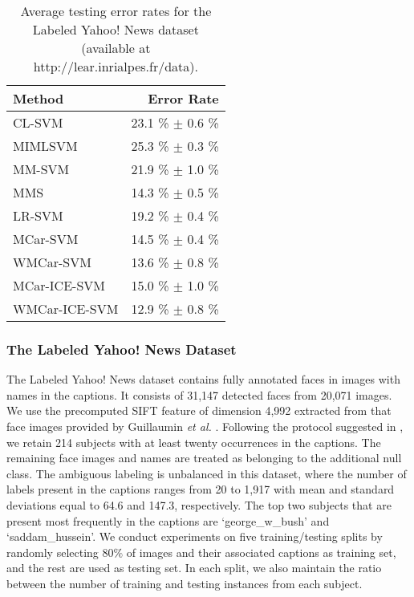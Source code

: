 \documentclass[10pt,journal,compsoc]{IEEEtran}
\newcommand{\head}[1]{\textnormal{\textbf{#1}}}
\begin{document}
\begin{table}
\begin{center}
\begin{tabular}{lr}
  \toprule[1.0pt]
  \head{Method\quad\quad\quad\quad\quad\quad\quad \,\,}  & \head{Error Rate}\\
  \midrule
  CL-SVM    & 23.1 \% $\pm$ 0.6 \%\\
  MIMLSVM \cite{Zhou2006}  & 25.3  \% $\pm$ 0.3 \%\\
  MM-SVM \cite{Berg2004} & 21.9 \% $\pm$ 1.0 \%\\  
  MMS \cite{Luo2010}  &14.3 \% $\pm$ 0.5 \% \\
  LR-SVM \cite{Zeng2013}  & 19.2 \%  $\pm$ 0.4 \%\\
  \midrule
  MCar-SVM   &  14.5 \%  $\pm$ 0.4 \%\\
  WMCar-SVM   & 13.6 \% $\pm$ 0.8 \%\\
  MCar-ICE-SVM   & 15.0 \%  $\pm$ 1.0 \% \\
  WMCar-ICE-SVM   &  12.9 \% $\pm$ 0.8 \%\\
  \bottomrule[1.0pt]
\end{tabular}
\end{center}
\caption{Average testing error rates for the Labeled Yahoo! News dataset (available at http://lear.inrialpes.fr/data).}
\label{tab:yahoo}
\end{table}


\subsubsection{The Labeled Yahoo! News Dataset}
The Labeled Yahoo! News dataset contains fully annotated faces in images with names in the captions. It consists of 31,147 detected faces from 20,071 images. We use the precomputed SIFT feature of dimension 4,992 extracted from that face images provided by Guillaumin \emph{et al.} \cite{Guillaumin2010}. Following the protocol suggested in \cite{Luo2010}, we retain 214 subjects with at least twenty occurrences in the captions. The remaining face images and names are treated as belonging to the additional null class. The ambiguous labeling is unbalanced in this dataset, where the number of labels present in the captions ranges from 20 to 1,917 with mean and standard deviations equal to 64.6 and 147.3, respectively. The top two subjects that are present most frequently in the captions are `george\_w\_bush' and `saddam\_hussein'. We conduct experiments on five training/testing splits by randomly selecting $80\%$ of images and their associated captions as training set, and the rest are used as testing set. In each split, we also maintain the ratio between the number of training and testing instances from each subject.
\end{document}
